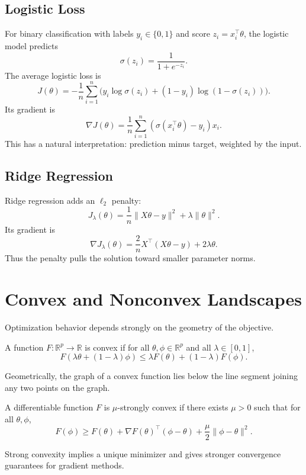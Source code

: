 \subsection{Logistic Loss}

For binary classification with labels $y_i\in\{0,1\}$ and score $z_i=x_i^\top\theta$, the logistic model predicts
\[
\sigma(z_i)=\frac{1}{1+e^{-z_i}}.
\]
The average logistic loss is
\[
J(\theta)= -\frac1n\sum_{i=1}^n \Big(y_i\log \sigma(z_i)+(1-y_i)\log(1-\sigma(z_i))\Big).
\]
Its gradient is
\[
\nabla J(\theta)=\frac1n\sum_{i=1}^n (\sigma(x_i^\top\theta)-y_i)x_i.
\]
This has a natural interpretation: prediction minus target, weighted by the input.

\subsection{Ridge Regression}

Ridge regression adds an $\ell_2$ penalty:
\[
J_{\lambda}(\theta)=\frac1n\|X\theta-y\|^2+\lambda \|\theta\|^2.
\]
Its gradient is
\[
\nabla J_{\lambda}(\theta)=\frac{2}{n}X^\top(X\theta-y)+2\lambda \theta.
\]
Thus the penalty pulls the solution toward smaller parameter norms.

\section{Convex and Nonconvex Landscapes}

Optimization behavior depends strongly on the geometry of the objective.

\begin{definition}
A function $F:\mathbb{R}^p\to\mathbb{R}$ is convex if for all $\theta,\phi\in\mathbb{R}^p$ and all $\lambda\in[0,1]$,
\[
F(\lambda \theta +(1-\lambda)\phi)
\le
\lambda F(\theta)+(1-\lambda)F(\phi).
\]
\end{definition}

Geometrically, the graph of a convex function lies below the line segment joining any two points on the graph.

\begin{definition}
A differentiable function $F$ is $\mu$-strongly convex if there exists $\mu>0$ such that for all $\theta,\phi$,
\[
F(\phi)\ge F(\theta)+\nabla F(\theta)^\top(\phi-\theta)+\frac{\mu}{2}\|\phi-\theta\|^2.
\]
\end{definition}

Strong convexity implies a unique minimizer and gives stronger convergence guarantees for gradient methods.

